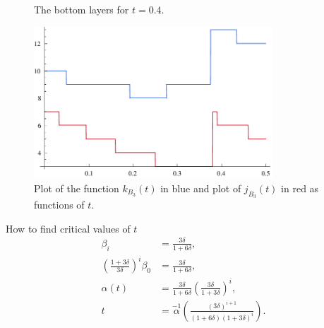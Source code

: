 \documentclass{beamer}
\begin{document}
\begin{frame}
\begin{figure}%
\begin{center}
\resizebox{6cm}{!}{%

}
\end{center}
\caption{The bottom layers for $t = 0.4$.}
\end{figure}
\end{frame}

\begin{frame}
\begin{figure}[t]
\centering
\includegraphics[width=0.8\textwidth]{./figures/lower-layer-kj.pdf}
\caption{Plot of the function $k_{B_{3}}(t)$ in blue and plot of $j_{B_{3}}(t)$ in red as functions of $t$.}
\end{figure}
\end{frame}

\begin{frame}
\begin{block}{How to find critical values of $t$}
\begin{align*}
\beta_{i} &= \frac{3\delta}{1+6\delta}, \\[6pt]%
\left(\frac{1+3\delta}{3\delta}\right)^{i}\beta_{0} &= \frac{3\delta}{1+6\delta}, \\[6pt]%
\alpha(t) &= \frac{3\delta}{1+6\delta}\left(\frac{3\delta}{1+3\delta}\right)^{i}, \\[6pt]%
t &= \overset{-1}{\alpha}\left( \frac{\left(3\delta\right)^{i+1}}{(1+6\delta)\left(1+3\delta\right)^{i}} \right).
\end{align*}	
\end{block}
\end{frame}
\end{document}
